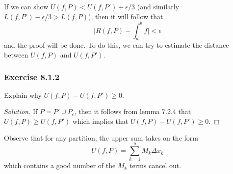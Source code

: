 If we can show \( U(f,P) < U(f,P') + \epsilon / 3   \) (and similarly \( L(f,P') - \epsilon / 3 > L(f,P)  \)), then it will follow that 
\[  \Big| R(f,P) - \int_{ a }^{ b } f  \Big| < \epsilon \]
and the proof will be done. To do this, we can try to estimate the distance between \( U(f,P)  \) and \( U(f, P')  \).
\subsubsection{Exercise 8.1.2} Explain why \( U(f,P) - U(f,P') \geq 0  \).
\begin{proof}[Solution]
If \( P = P' \cup P_{\epsilon }  \), then it follows from lemma 7.2.4 that \( U(f,P) \geq U(f,P')   \) which implies that \( U(f,P) - U(f,P') \geq 0  \). 
\end{proof}

Observe that for any partition, the upper sum takes on the form 
\[  U(f,P) = \sum_{ k=1 }^{ n } M_{k } \Delta x_{k } \] which contains a good number of the \( M_{k }  \) terms cancel out.
